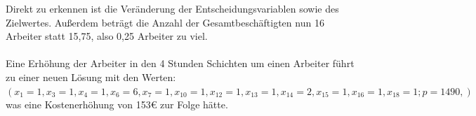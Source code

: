 Direkt zu erkennen ist die Veränderung der Entscheidungsvariablen sowie des Zielwertes. Außerdem beträgt die Anzahl der Gesamtbeschäftigten nun 16 Arbeiter statt 15,75, also 0,25 Arbeiter zu viel.\\
\\
Eine Erhöhung der Arbeiter in den 4 Stunden Schichten um einen Arbeiter führt zu einer neuen Lösung mit den Werten: $(x_1=1, x_3=1, x_4=1, x_6=6, x_7=1, x_{10}=1, x_{12}=1, x_{13}=1, x_{14}=2, x_{15}=1, x_{16}=1, x_{18}=1; p=1490,)$ was eine Kostenerhöhung von 153€ zur Folge hätte.\\




